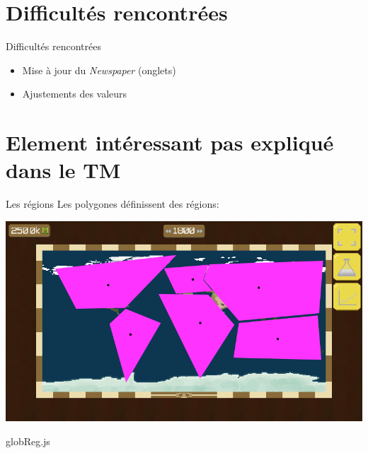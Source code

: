 \documentclass[11pt]{beamer}
\newcommand{\pauseditemize}{\pause \begin{itemize}[<+->]}
\begin{document}
\section{Difficultés rencontrées}

\begin{frame}{Difficultés rencontrées}

\pauseditemize
	\item Mise à jour du \textit{Newspaper} (onglets)
	\item Ajustements des valeurs
\end{itemize}

\end{frame}

\section{Element intéressant pas expliqué dans le TM} %


%


\begin{frame}{Les régions}
\pause
Les polygones définissent des régions:
\begin{center} \includegraphics[scale=.3]{../images/regionsPoly} \end{center}
\end{frame}

\begin{frame}{globReg.js}



\end{frame}
\end{document}
